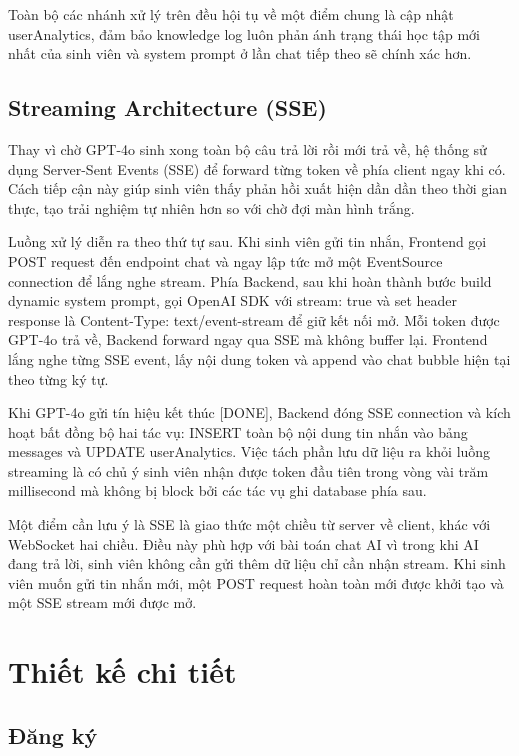 \documentclass[../main.tex]{subfiles}
\begin{document}
Toàn bộ các nhánh xử lý trên đều hội tụ về một điểm chung là cập nhật userAnalytics, đảm bảo knowledge log luôn phản ánh trạng thái học tập mới nhất của sinh viên và system prompt ở lần chat tiếp theo sẽ chính xác hơn.

\subsection{Streaming Architecture (SSE)}

Thay vì chờ GPT-4o sinh xong toàn bộ câu trả lời rồi mới trả về, hệ thống sử dụng Server-Sent Events (SSE) để forward từng token về phía client ngay khi có. Cách tiếp cận này giúp sinh viên thấy phản hồi xuất hiện dần dần theo thời gian thực, tạo trải nghiệm tự nhiên hơn so với chờ đợi màn hình trắng.

Luồng xử lý diễn ra theo thứ tự sau. Khi sinh viên gửi tin nhắn, Frontend gọi POST request đến endpoint chat và ngay lập tức mở một EventSource connection để lắng nghe stream. Phía Backend, sau khi hoàn thành bước build dynamic system prompt, gọi OpenAI SDK với stream: true và set header response là Content-Type: text/event-stream để giữ kết nối mở. Mỗi token được GPT-4o trả về, Backend forward ngay qua SSE mà không buffer lại. Frontend lắng nghe từng SSE event, lấy nội dung token và append vào chat bubble hiện tại theo từng ký tự.

Khi GPT-4o gửi tín hiệu kết thúc [DONE], Backend đóng SSE connection và kích hoạt bất đồng bộ hai tác vụ: INSERT toàn bộ nội dung tin nhắn vào bảng messages và UPDATE userAnalytics. Việc tách phần lưu dữ liệu ra khỏi luồng streaming là có chủ ý sinh viên nhận được token đầu tiên trong vòng vài trăm millisecond mà không bị block bởi các tác vụ ghi database phía sau.

Một điểm cần lưu ý là SSE là giao thức một chiều từ server về client, khác với WebSocket hai chiều. Điều này phù hợp với bài toán chat AI vì trong khi AI đang trả lời, sinh viên không cần gửi thêm dữ liệu chỉ cần nhận stream. Khi sinh viên muốn gửi tin nhắn mới, một POST request hoàn toàn mới được khởi tạo và một SSE stream mới được mở.

\section{Thiết kế chi tiết}

\subsection{Đăng ký}
\end{document}
